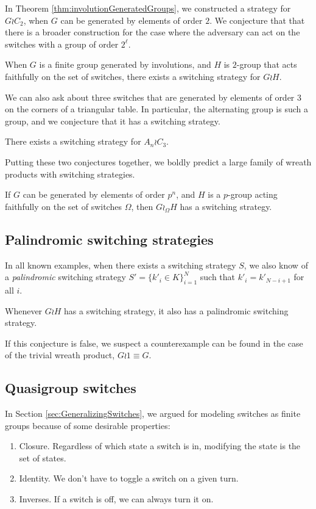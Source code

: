 In Theorem \ref{thm:involutionGeneratedGroups},
we constructed a strategy for $G \wr C_2$,
when $G$ can be generated by elements of order $2$.
We conjecture that that there is a broader construction for the case where
the adversary can act on the switches with a group of order $2^\ell$.

\begin{conjecture}
  When $G$ is a finite group generated by involutions, and
  $H$ is $2$-group that acts faithfully on the set of switches,
  there exists a switching strategy for $G \wr H$.
\end{conjecture}

We can also ask about three switches that are generated by elements of order
$3$ on the corners of a triangular table. In particular, the alternating group
is such a group, and we conjecture that it has a switching strategy.

\begin{conjecture}
  There exists a switching strategy for $A_n \wr C_3$.
\end{conjecture}

Putting these two conjectures together, we boldly predict a large family
of wreath products with switching strategies.
\begin{conjecture}
  If $G$ can be generated by elements of order $p^n$, and $H$ is a $p$-group
  acting faithfully on the set of switches $\Omega$, then $G \wr_\Omega H$ has
  a switching strategy.
\end{conjecture}

\subsection{Palindromic switching strategies}
In all known examples, when there exists a switching strategy $S$,
we also know of a \textit{palindromic} switching strategy
$S' = \{k'_i \in K\}_{i=1}^N$
such that $k'_i = k'_{N-i+1}$ for all $i$.

\begin{conjecture}
  Whenever $G \wr H$ has a switching strategy, it also has a palindromic switching
  strategy.
\end{conjecture}

If this conjecture is false, we suspect a counterexample can be found in the
case of the trivial wreath product, $G \wr \mathrm{1} \equiv G$.

\subsection{Quasigroup switches}
\label{sub:quasigroupSwitches}
In Section \ref{sec:GeneralizingSwitches}, we argued for modeling switches as
finite groups because of some desirable properties: \begin{enumerate}
  \item Closure. Regardless of which state a switch is in, modifying the state is the set of states.
  \item Identity. We don't have to toggle a switch on a given turn.
  \item Inverses. If a switch is off, we can always turn it on.
\end{enumerate}

